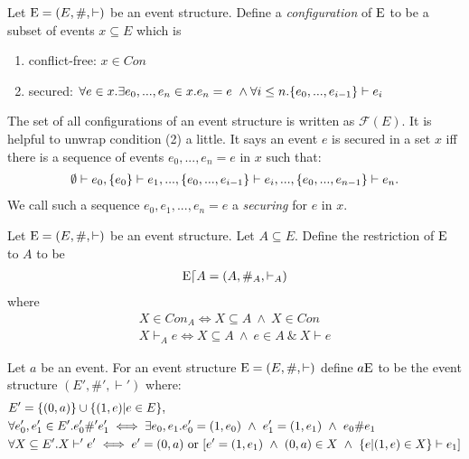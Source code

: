 \begin{definition}[Configuration]
    \label{conf}
    Let $\mathrm{E} = (E,\#,\vdash)$ be an event structure.
    Define a \textit{configuration} of $\mathrm{E}$ to be a subset of events $x \subseteq E$ which is
    \begin{enumerate}
        \item conflict-free: $x \in Con$
        \item secured: $\forall e \in x. \exists e_0,...,e_n \in x. e_n = e \ \wedge
                  \forall i \leq n. \{e_0,...,e_{i-1}\} \vdash e_i$
    \end{enumerate}
\end{definition}
\noindent The set of all configurations of an event structure is written as $\mathcal{F}(E)$.
It is helpful to unwrap condition (2) a little. It says an event $e$ is secured in a set $x$
iff there is a sequence of events $e_0,...,e_n = e$ in $x$ such that:
\begin{align*}
    \emptyset \vdash e_0, \{e_0\} \vdash e_1, ..., \{e_0,...,e_{i-1}\} \vdash e_i,...,
    \{e_0,...,e_{n-1}\} \vdash e_n.
\end{align*}
We call such a sequence $e_0,e_1,...,e_n = e$ a \emph{securing} for $e$ in $x$.

\begin{definition}[Restriction]
    Let $\mathrm{E} = (E,\#,\vdash)$ be an event structure.
    Let $A \subseteq E$.
    Define the restriction of $\mathrm{E}$ to $A$ to be
    \begin{align*}
        \mathrm{E} \lceil A = (A,\#_A,\vdash_A)
    \end{align*}
    where
    \begin{align*}
        X \in Con_A \iff X \subseteq A \ \wedge \ X \in Con \\
        X \vdash_A e \iff X \subseteq A \ \wedge \ e \in A \ \& \ X \vdash e
    \end{align*}
\end{definition}

\begin{definition}[Prefixing]
    Let $a$ be an event.
    For an event structure $\mathrm{E} = (E,\#,\vdash)$ define $a\mathrm{E}$ to be the event structure $(E',\#',\vdash')$ where:
    \begin{align*}
         & E' = \{(0,a)\} \cup \{(1,e)|e \in E\},                                                                                                        \\
         & \forall e_0',e_1'\in E' . e_0' \#' e_1'  \iff \exists e_0,e_1.e_0' = (1,e_0)
        \ \wedge \ e_1' = (1,e_1) \ \wedge \ e_0 \# e_1                                                                                                  \\
         & \forall X \subseteq E' . X \vdash' e' \iff e' = (0,a) \text{ or } [e' = (1,e_1) \ \wedge \ (0,a)\in X \ \wedge \ \{e|(1,e)\in X\} \vdash e_1]
    \end{align*}
\end{definition}


